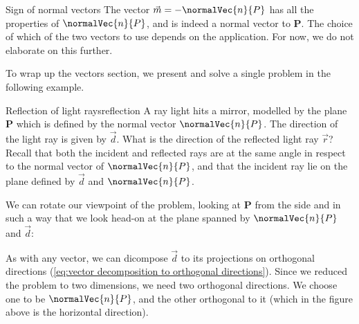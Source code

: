 \begin{note}{Sign of normal vectors}{}
	The vector $\vec{m}=-\normalVec{n}{P}$ has all the properties of $\normalVec{n}{P}$, and is indeed a normal vector to $\mathbf{P}$. The choice of which of the two vectors to use depends on the application. For now, we do not elaborate on this further.
\end{note}

To wrap up the vectors section, we present and solve a single problem in the following example.

\begin{example}{Reflection of light rays}{reflection}
	A ray light hits a mirror, modelled by the plane $\mathbf{P}$ which is defined by the normal vector $\normalVec{n}{P}$. The direction of the light ray is given by $\vec{d}$. What is the direction of the reflected light ray $\vec{r}$? Recall that both the incident and reflected rays are at the same angle in respect to the normal vector of $\normalVec{n}{P}$, and that the incident ray lie on the plane defined by $\vec{d}$ and $\normalVec{n}{P}$.

\centering
{}

\flushleft
We can rotate our viewpoint of the problem, looking at $\mathbf{P}$ from the side and in such a way that we look head-on at the plane spanned by $\normalVec{n}{P}$ and $\vec{d}$:

\vspace{1em}
\centering
{}

\flushleft
As with any vector, we can dicompose $\vec{d}$ to its projections on orthogonal directions (\autoref{eq:vector decomposition to orthogonal directions}). Since we reduced the problem to two dimensions, we need two orthogonal directions. We choose one to be $\normalVec{n}{P}$, and the other orthogonal to it (which in the figure above is the horizontal direction).
\end{example}
